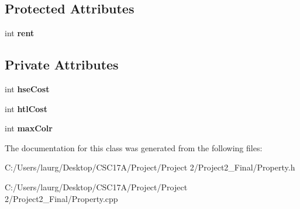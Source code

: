 \subsection*{Protected Attributes}
\begin{DoxyCompactItemize}
\item 
\mbox{\label{class_property_a04e947c064fb7d02ac757335e5d7e583}} 
int {\bfseries rent}
\end{DoxyCompactItemize}
\subsection*{Private Attributes}
\begin{DoxyCompactItemize}
\item 
\mbox{\label{class_property_ad09061ba30d1ea3df659f1555b998fc3}} 
int {\bfseries hse\+Cost}
\item 
\mbox{\label{class_property_a87c4d4ebc92499b0337272e4aedfed53}} 
int {\bfseries htl\+Cost}
\item 
\mbox{\label{class_property_af26458d798fdd15493edf5b72ff7f18f}} 
int {\bfseries max\+Colr}
\end{DoxyCompactItemize}


The documentation for this class was generated from the following files\+:\begin{DoxyCompactItemize}
\item 
C\+:/\+Users/laurg/\+Desktop/\+C\+S\+C17\+A/\+Project/\+Project 2/\+Project2\+\_\+\+Final/Property.\+h\item 
C\+:/\+Users/laurg/\+Desktop/\+C\+S\+C17\+A/\+Project/\+Project 2/\+Project2\+\_\+\+Final/Property.\+cpp\end{DoxyCompactItemize}

